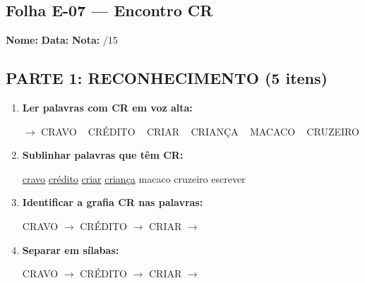 \subsection{Folha E-07 --- Encontro CR}
\begin{exercicio}



\noindent\textbf{Nome:} \underline{\hspace{3.2cm}} \quad \textbf{Data:} \underline{\hspace{1.6cm}} \quad \textbf{Nota:} \underline{\hspace{0.9cm}}/15


\subsection*{PARTE 1: RECONHECIMENTO (5 itens)}

\begin{enumerate}

  \item \textbf{Ler palavras com CR em voz alta:}
  \begin{center}
  $\rightarrow$ CRAVO ~ CRÉDITO ~ CRIAR ~ CRIANÇA ~ MACACO ~ CRUZEIRO
  \end{center}

  \item \textbf{Sublinhar palavras que têm CR:}

\begin{center}
  \uline{cravo} \quad \uline{crédito} \quad \uline{criar} \quad \uline{criança} \quad macaco \quad cruzeiro \quad escrever
\end{center}

  \item \textbf{Identificar a grafia CR nas palavras:}
  \begin{center}
  CRAVO $\rightarrow$ \underline{\hspace{1cm}} \quad CRÉDITO $\rightarrow$ \underline{\hspace{1cm}} \quad CRIAR $\rightarrow$ \underline{\hspace{1cm}}
  \end{center}

  \item \textbf{Separar em sílabas:}
  \begin{center}
  CRAVO $\rightarrow$ \underline{\hspace{1.2cm}} \quad CRÉDITO $\rightarrow$ \underline{\hspace{1.2cm}} \quad CRIAR $\rightarrow$ \underline{\hspace{1.2cm}}
  \end{center}


\end{enumerate}
\end{exercicio}
